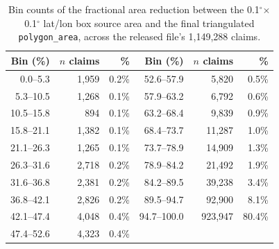 \begin{table}[h]
\centering
\begin{tabular}{rrr@{\hspace{2em}}rrr}
\toprule
Bin (\%) & $n$ claims & \% & Bin (\%) & $n$ claims & \% \\
\midrule
0.0--5.3 & 1,959 & 0.2\% & 52.6--57.9 & 5,820 & 0.5\% \\
5.3--10.5 & 1,268 & 0.1\% & 57.9--63.2 & 6,792 & 0.6\% \\
10.5--15.8 & 894 & 0.1\% & 63.2--68.4 & 9,839 & 0.9\% \\
15.8--21.1 & 1,382 & 0.1\% & 68.4--73.7 & 11,287 & 1.0\% \\
21.1--26.3 & 1,265 & 0.1\% & 73.7--78.9 & 14,909 & 1.3\% \\
26.3--31.6 & 2,718 & 0.2\% & 78.9--84.2 & 21,492 & 1.9\% \\
31.6--36.8 & 2,381 & 0.2\% & 84.2--89.5 & 39,238 & 3.4\% \\
36.8--42.1 & 2,826 & 0.2\% & 89.5--94.7 & 92,900 & 8.1\% \\
42.1--47.4 & 4,048 & 0.4\% & 94.7--100.0 & 923,947 & 80.4\% \\
47.4--52.6 & 4,323 & 0.4\% &  & &  \\
\bottomrule
\end{tabular}
\caption{Bin counts of the fractional area reduction between the 0.1$^\circ$$\times$0.1$^\circ$ lat/lon box source area and the final triangulated \texttt{polygon\_area}, across the released file's 1,149,288 claims.}
\label{tab:area-reduction-histogram}
\end{table}
